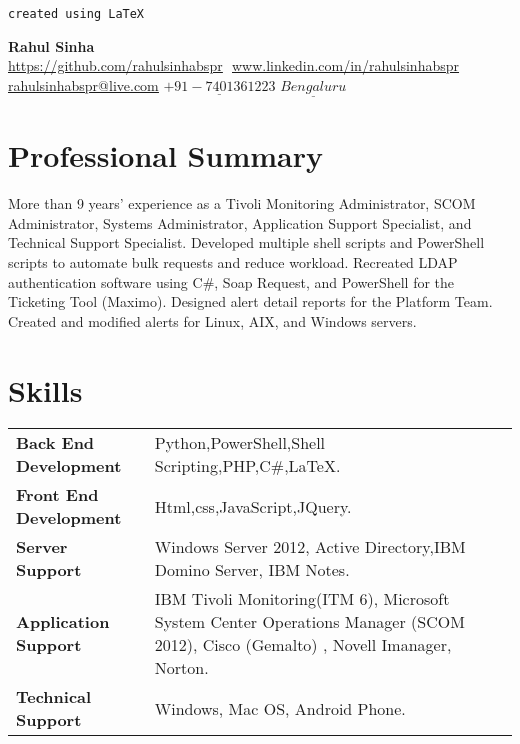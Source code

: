 \documentclass[letterpaper, 12pt]{article}
\begin{document}
	
	\begin{flushright}
		\texttt{created using {\LaTeX}}
	\end{flushright}
	\vspace*{-1cm}
	\begin{center}
		\textbf{\Huge Rahul Sinha} \\ \vspace{4pt}
		\href{https://github.com/rahulsinhabspr}{\underline{https://github.com/rahulsinhabspr}} $  $
		\href{www.linkedin.com/in/rahulsinhabspr}{\underline{www.linkedin.com/in/rahulsinhabspr}} $  $
		\href{mailto:rahulsinhabspr@live.com}
		{\underline{rahulsinhabspr@live.com}}
		\newline
		{$\underline{+91-7401361223}$}
		{$\underline{Bengaluru}$}
	\end{center}
	\section*{Professional Summary}
	\textnormal{More than 9 years' experience as a Tivoli Monitoring Administrator, SCOM Administrator, Systems Administrator, Application Support Specialist, and Technical Support Specialist. Developed multiple shell scripts and PowerShell scripts to automate bulk requests and reduce workload. Recreated LDAP authentication software using C\#, Soap Request, and PowerShell for the Ticketing Tool (Maximo). Designed alert detail reports for the Platform Team. Created and modified alerts for Linux, AIX, and Windows servers.} 
	\section*{Skills}
		\begin{tabular}{m{} m{}} 
			\textbf{Back End Development} & Python,PowerShell,Shell Scripting,PHP,C\#,\LaTeX.  \\ 
			\textbf{Front End Development} & Html,css,JavaScript,JQuery. \\
			\textbf{Server Support} & Windows Server 2012, Active Directory,IBM Domino Server, IBM Notes. \\
			\textbf{Application Support} & IBM Tivoli Monitoring(ITM 6), Microsoft System Center Operations Manager (SCOM 2012), Cisco (Gemalto) , Novell Imanager, Norton. \\ 
			\textbf{Technical Support} & Windows, Mac OS, Android Phone. \\ 
		\end{tabular}
\end{document}
